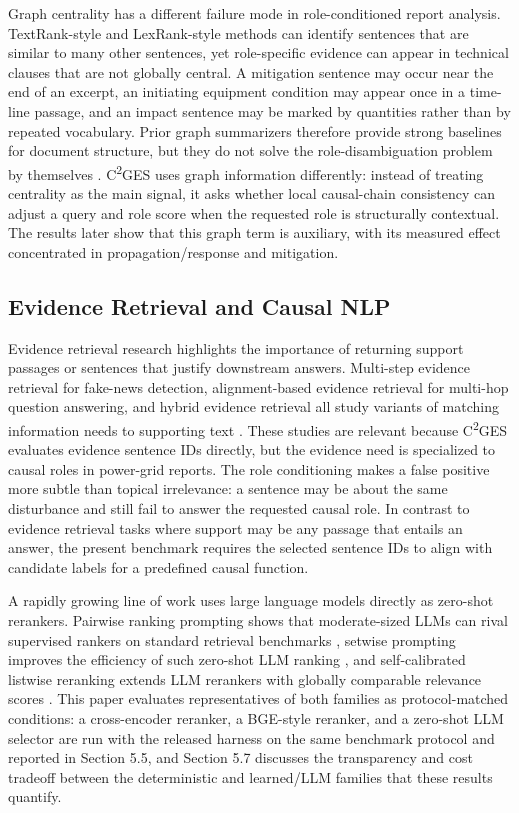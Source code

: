 \documentclass{article}
\begin{document}
Graph centrality has a different failure mode in role-conditioned report analysis. TextRank-style and LexRank-style methods can identify sentences that are similar to many other sentences, yet role-specific evidence can appear in technical clauses that are not globally central. A mitigation sentence may occur near the end of an excerpt, an initiating equipment condition may appear once in a time-line passage, and an impact sentence may be marked by quantities rather than by repeated vocabulary. Prior graph summarizers therefore provide strong baselines for document structure, but they do not solve the role-disambiguation problem by themselves \cite{khor2021text,belwal2020graphbased}. C\textsuperscript{2}GES uses graph information differently: instead of treating centrality as the main signal, it asks whether local causal-chain consistency can adjust a query and role score when the requested role is structurally contextual. The results later show that this graph term is auxiliary, with its measured effect concentrated in propagation/response and mitigation.

\subsection{Evidence Retrieval and Causal NLP}
\label{sec:evidence_causal}

Evidence retrieval research highlights the importance of returning support passages or sentences that justify downstream answers. Multi-step evidence retrieval for fake-news detection, alignment-based evidence retrieval for multi-hop question answering, and hybrid evidence retrieval all study variants of matching information needs to supporting text \cite{liao2023muser,yadav2020unsupervised,liang2020hammer}. These studies are relevant because C\textsuperscript{2}GES evaluates evidence sentence IDs directly, but the evidence need is specialized to causal roles in power-grid reports. The role conditioning makes a false positive more subtle than topical irrelevance: a sentence may be about the same disturbance and still fail to answer the requested causal role. In contrast to evidence retrieval tasks where support may be any passage that entails an answer, the present benchmark requires the selected sentence IDs to align with candidate labels for a predefined causal function.

A rapidly growing line of work uses large language models directly as zero-shot rerankers. Pairwise ranking prompting shows that moderate-sized LLMs can rival supervised rankers on standard retrieval benchmarks \cite{qin2024pairwise}, setwise prompting improves the efficiency of such zero-shot LLM ranking \cite{zhuang2024setwise}, and self-calibrated listwise reranking extends LLM rerankers with globally comparable relevance scores \cite{ren2025selfcalibrated}. This paper evaluates representatives of both families as protocol-matched conditions: a cross-encoder reranker, a BGE-style reranker, and a zero-shot LLM selector are run with the released harness on the same benchmark protocol and reported in Section 5.5, and Section 5.7 discusses the transparency and cost tradeoff between the deterministic and learned/LLM families that these results quantify.
\end{document}
